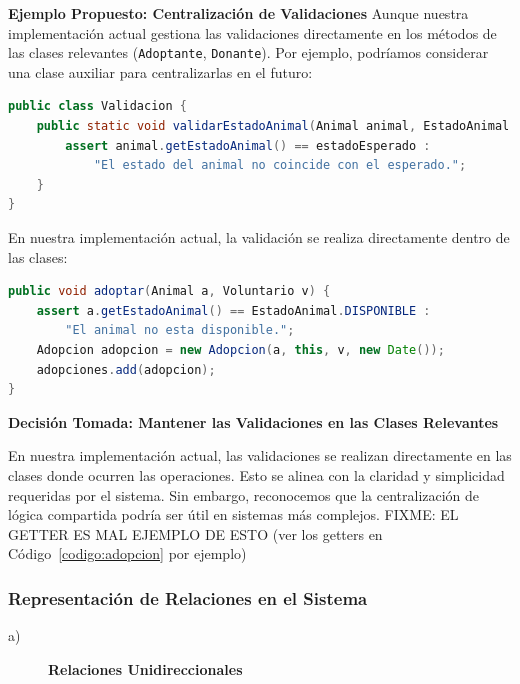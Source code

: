 \textbf{Ejemplo Propuesto: Centralización de Validaciones}  
Aunque nuestra implementación actual gestiona las validaciones directamente en los métodos 
de las clases relevantes (\texttt{Adoptante}, \texttt{Donante}). Por ejemplo, podríamos considerar una 
clase auxiliar para centralizarlas en el futuro:

\begin{lstlisting}[style = javaEspecifico, language=Java, caption={Clase Auxiliar para Validaciones}] 
public class Validacion {
    public static void validarEstadoAnimal(Animal animal, EstadoAnimal estadoEsperado) {
        assert animal.getEstadoAnimal() == estadoEsperado : 
            "El estado del animal no coincide con el esperado.";
    }
}
\end{lstlisting}

En nuestra implementación actual, la validación se realiza directamente dentro de las clases:

\begin{lstlisting}[style = javaEspecifico, language=Java, caption={Manejo de validaciones dentro del método Adoptar}] 
public void adoptar(Animal a, Voluntario v) {
    assert a.getEstadoAnimal() == EstadoAnimal.DISPONIBLE : 
        "El animal no esta disponible.";
    Adopcion adopcion = new Adopcion(a, this, v, new Date());
    adopciones.add(adopcion);
}
\end{lstlisting}
\vspace{0.15cm}
\textbf{Decisión Tomada: Mantener las Validaciones en las Clases Relevantes}\par
En nuestra implementación actual, las validaciones se realizan directamente en las clases 
donde ocurren las operaciones. Esto se alinea con la claridad y simplicidad requeridas por 
el sistema. Sin embargo, reconocemos que la centralización de lógica compartida podría ser 
útil en sistemas más complejos. FIXME: EL GETTER ES MAL EJEMPLO DE ESTO (ver los getters en Código~\ref{codigo:adopcion} por ejemplo) 



\subsubsection{Representación de Relaciones en el Sistema}

\begin{description}
    \item[a)] \textbf{Relaciones Unidireccionales}
\end{description}


